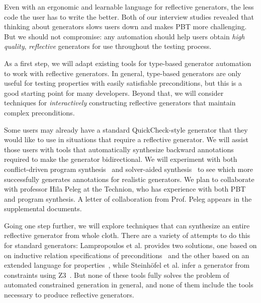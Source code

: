 
%
Even with an ergonomic and learnable language for reflective generators, the
less code the user has to write the better. Both of our interview studies
revealed
that thinking about generators slows users down and makes PBT more challenging.
But we should not compromise: any automation should help users obtain {\em high
quality}, {\em reflective} generators for use throughout the testing process.

As a first step, we will adapt existing tools for type-based generator
automation~\cite{mista2019deriving} to work with reflective generators.
In general, type-based
generators are only useful for testing properties with easily satisfiable
preconditions, but this is a good starting point for many developers. Beyond
that, we will consider techniques for {\em interactively}
constructing reflective generators that maintain complex preconditions.

Some users may already have a standard QuickCheck-style generator that
they would like to use
in situations that require a reflective generator. We will assist those
users with tools that automatically synthesize backward annotations
required to make the generator bidirectional. We will experiment with both
conflict-driven program synthesis~\cite{feng_program_2018} and solver-aided
synthesis~\cite{torlak_growing_2013} to see which more successfully generates
annotations for realistic generators.
We plan to collaborate with professor Hila
Peleg at the Technion, who has experience with both PBT and program synthesis. A
letter of collaboration from Prof.{} Peleg appears in the supplemental documents.

Going one step further, we will explore techniques that can synthesize an
entire reflective generator from whole cloth. There are a variety of
attempts to do this for standard generators: Lampropoulos et al. provides
two solutions, one based on on inductive relation specifications of
preconditions~\cite{lampropoulos2017generating} and the other based on an
extended language for properties~\cite{beginners-luck}, while Steinh\"ofel et al.
infer a generator from constraints using
Z3~\cite{steinhofel_input_2022,de_moura_z3_2008}.
But none of these
tools fully solves the problem of automated constrained generation in
general, and none of them include the tools necessary to produce reflective
generators.

